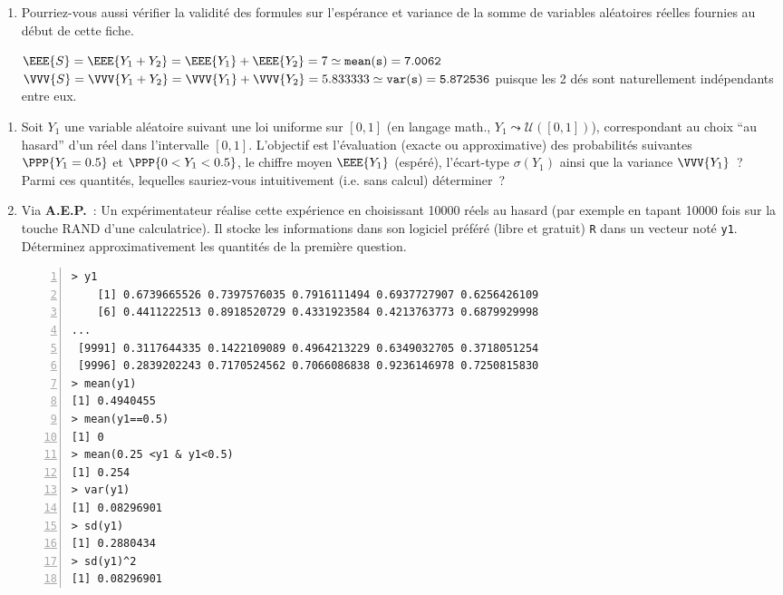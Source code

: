 \documentclass[10pt]{report}
\begin{document}
\begin{exercice}
\begin{enumerate}
\item Pourriez-vous aussi vérifier la validité des formules sur l'espérance et variance de la somme de variables aléatoires réelles fournies au début de cette fiche. 

\begin{Correction}
$\EEE{S}=\EEE{Y_1+Y_2}=\EEE{Y_1}+\EEE{Y_2}=7\simeq \mathtt{mean(s)=7.0062}$\\
$\VVV{S}=\VVV{Y_1+Y_2}=\VVV{Y_1}+\VVV{Y_2}=5.833333\simeq \mathtt{var(s)=5.872536}$
puisque les 2 dés sont naturellement indépendants entre eux.
\end{Correction}

\end{enumerate}
\end{exercice}


\begin{exercice}\label{ex:unif}
\begin{enumerate}
\item Soit $Y_1$ une variable aléatoire suivant une loi uniforme sur $[0,1]$ (en langage math., $Y_1\leadsto \mathcal{U}([0,1])$), correspondant au choix ``au hasard'' d'un réel dans l'intervalle $[0,1]$. L'objectif est l'évaluation (exacte ou approximative) des probabilités suivantes $\PPP{Y_1=0.5}$ et $\PPP{0<Y_1<0.5}$, le chiffre moyen $\EEE{Y_1}$ (espéré), l'écart-type $\sigma(Y_1)$ ainsi que la variance $\VVV{Y_1}$~? Parmi ces quantités, lequelles sauriez-vous intuitivement (i.e. sans calcul) déterminer~?


\item Via \textbf{A.E.P.}~: Un expérimentateur réalise cette expérience en choisissant 10000 réels au hasard (par exemple en tapant 10000 fois sur la touche RAND d'une calculatrice). Il stocke les informations dans son logiciel préféré (libre et gratuit) \texttt{R} dans un vecteur noté \texttt{y1}. Déterminez approximativement les quantités de la première question.
\begin{Verbatim}[frame=leftline,fontfamily=tt,fontshape=n,numbers=left]
> y1
    [1] 0.6739665526 0.7397576035 0.7916111494 0.6937727907 0.6256426109
    [6] 0.4411222513 0.8918520729 0.4331923584 0.4213763773 0.6879929998
...
 [9991] 0.3117644335 0.1422109089 0.4964213229 0.6349032705 0.3718051254
 [9996] 0.2839202243 0.7170524562 0.7066086838 0.9236146978 0.7250815830
> mean(y1)
[1] 0.4940455
> mean(y1==0.5)
[1] 0
> mean(0.25 <y1 & y1<0.5)
[1] 0.254
> var(y1)
[1] 0.08296901
> sd(y1)
[1] 0.2880434
> sd(y1)^2
[1] 0.08296901
\end{Verbatim}



\end{enumerate}
\end{exercice}
\end{document}
